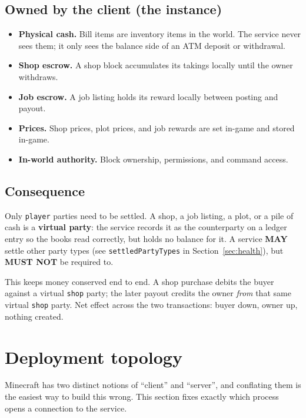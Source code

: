 \documentclass[11pt,a4paper]{article}
\newcommand{\code}[1]{\texttt{\small #1}}
\newcommand{\opt}{\textbf{MAY}}
\newcommand{\keybox}[2]{%
  \par\vspace{0.5em}\noindent
  \colorbox{#1}{%
    \begin{minipage}{\dimexpr\linewidth-2\fboxsep\relax}
    \vspace{0.35em}\small #2\vspace{0.35em}
    \end{minipage}}%
  \par\vspace{0.5em}}
\newcommand{\note}[1]{\keybox{omceWash}{#1}}
\begin{document}
\subsection{Owned by the client (the instance)}
\begin{itemize}
\item \textbf{Physical cash.} Bill items are inventory items in the world. The service never sees
      them; it only sees the balance side of an ATM deposit or withdrawal.
\item \textbf{Shop escrow.} A shop block accumulates its takings locally until the owner withdraws.
\item \textbf{Job escrow.} A job listing holds its reward locally between posting and payout.
\item \textbf{Prices.} Shop prices, plot prices, and job rewards are set in-game and stored in-game.
\item \textbf{In-world authority.} Block ownership, permissions, and command access.
\end{itemize}

\subsection{Consequence}

Only \code{player} parties need to be settled. A shop, a job listing, a plot, or a pile of cash is a
\textbf{virtual party}: the service records it as the counterparty on a ledger entry so the books
read correctly, but holds no balance for it. A service \opt{} settle other party types (see
\code{settledPartyTypes} in Section~\ref{sec:health}), but \textbf{MUST NOT} be required to.

\note{This keeps money conserved end to end. A shop purchase debits the buyer against a virtual
\code{shop} party; the later payout credits the owner \emph{from} that same virtual \code{shop}
party. Net effect across the two transactions: buyer down, owner up, nothing created.}

\section{Deployment topology}
\label{sec:topology}

Minecraft has two distinct notions of ``client'' and ``server'', and conflating them is the easiest
way to build this wrong. This section fixes exactly which process opens a connection to the
service.
\end{document}

